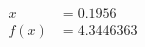 \documentclass[preview]{standalone}
\begin{document}
\begin{align*}
x &= 0.1956\\f(x) &= 4.3446363
\end{align*}
\end{document}
